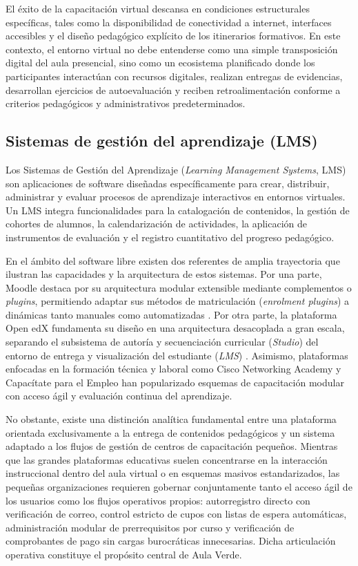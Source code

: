 El éxito de la capacitación virtual descansa en condiciones estructurales específicas, tales como la disponibilidad de conectividad a internet, interfaces accesibles y el diseño pedagógico explícito de los itinerarios formativos. En este contexto, el entorno virtual no debe entenderse como una simple transposición digital del aula presencial, sino como un ecosistema planificado donde los participantes interactúan con recursos digitales, realizan entregas de evidencias, desarrollan ejercicios de autoevaluación y reciben retroalimentación conforme a criterios pedagógicos y administrativos predeterminados.

\subsection{Sistemas de gestión del aprendizaje (LMS)}

Los Sistemas de Gestión del Aprendizaje (\textit{Learning Management Systems}, LMS) son aplicaciones de software diseñadas específicamente para crear, distribuir, administrar y evaluar procesos de aprendizaje interactivos en entornos virtuales. Un LMS integra funcionalidades para la catalogación de contenidos, la gestión de cohortes de alumnos, la calendarización de actividades, la aplicación de instrumentos de evaluación y el registro cuantitativo del progreso pedagógico.

En el ámbito del software libre existen dos referentes de amplia trayectoria que ilustran las capacidades y la arquitectura de estos sistemas. Por una parte, Moodle destaca por su arquitectura modular extensible mediante complementos o \textit{plugins}, permitiendo adaptar sus métodos de matriculación (\textit{enrolment plugins}) a dinámicas tanto manuales como automatizadas \cite{moodle2024enrolment}. Por otra parte, la plataforma Open edX fundamenta su diseño en una arquitectura desacoplada a gran escala, separando el subsistema de autoría y secuenciación curricular (\textit{Studio}) del entorno de entrega y visualización del estudiante (\textit{LMS}) \cite{openedx2024platform, openedx2024courseoutline}. Asimismo, plataformas enfocadas en la formación técnica y laboral como Cisco Networking Academy \cite{cisco2024netacad} y Capacítate para el Empleo \cite{fundacion2024capacitate} han popularizado esquemas de capacitación modular con acceso ágil y evaluación continua del aprendizaje.

No obstante, existe una distinción analítica fundamental entre una plataforma orientada exclusivamente a la entrega de contenidos pedagógicos y un sistema adaptado a los flujos de gestión de centros de capacitación pequeños. Mientras que las grandes plataformas educativas suelen concentrarse en la interacción instruccional dentro del aula virtual o en esquemas masivos estandarizados, las pequeñas organizaciones requieren gobernar conjuntamente tanto el acceso ágil de los usuarios como los flujos operativos propios: autorregistro directo con verificación de correo, control estricto de cupos con listas de espera automáticas, administración modular de prerrequisitos por curso y verificación de comprobantes de pago sin cargas burocráticas innecesarias. Dicha articulación operativa constituye el propósito central de Aula Verde.

